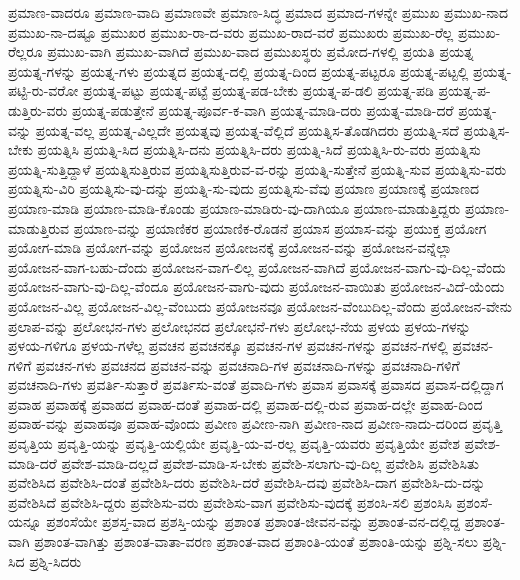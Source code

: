 {ಪ್ರಮಾಣ-ವಾದರೂ
ಪ್ರಮಾಣ-ವಾದಿ
ಪ್ರಮಾಣವೇ
ಪ್ರಮಾಣ-ಸಿದ್ಧ
ಪ್ರಮಾದ
ಪ್ರಮಾದ-ಗಳನ್ನೇ
ಪ್ರಮುಖ
ಪ್ರಮುಖ-ನಾದ
ಪ್ರಮುಖ-ನಾ-ದಷ್ಟೂ
ಪ್ರಮುಖರ
ಪ್ರಮುಖ-ರಾ-ದ-ವರು
ಪ್ರಮುಖ-ರಾದ-ವರೆ
ಪ್ರಮುಖರು
ಪ್ರಮುಖ-ರೆಲ್ಲ
ಪ್ರಮುಖ-ರೆಲ್ಲರೂ
ಪ್ರಮುಖ-ವಾಗಿ
ಪ್ರಮುಖ-ವಾಗಿದೆ
ಪ್ರಮುಖ-ವಾದ
ಪ್ರಮುಖಸ್ಥರು
ಪ್ರಮೋದ-ಗಳಲ್ಲಿ
ಪ್ರಯತಿ
ಪ್ರಯತ್ನ
ಪ್ರಯತ್ನ-ಗಳನ್ನು
ಪ್ರಯತ್ನ-ಗಳು
ಪ್ರಯತ್ನದ
ಪ್ರಯತ್ನ-ದಲ್ಲಿ
ಪ್ರಯತ್ನ-ದಿಂದ
ಪ್ರಯತ್ನ-ಪಟ್ಟರೂ
ಪ್ರಯತ್ನ-ಪಟ್ಟಲ್ಲಿ
ಪ್ರಯತ್ನ-ಪಟ್ಟಿ-ರು-ವರೋ
ಪ್ರಯತ್ನ-ಪಟ್ಟು
ಪ್ರಯತ್ನ-ಪಟ್ಟೆ
ಪ್ರಯತ್ನ-ಪಡ-ಬೇಕು
ಪ್ರಯತ್ನ-ಪ-ಡಲಿ
ಪ್ರಯತ್ನ-ಪಡಿ
ಪ್ರಯತ್ನ-ಪ-ಡುತ್ತಿರು-ವರು
ಪ್ರಯತ್ನ-ಪಡುತ್ತೇನೆ
ಪ್ರಯತ್ನ-ಪೂರ್ವ-ಕ-ವಾಗಿ
ಪ್ರಯತ್ನ-ಮಾಡಿ-ದರು
ಪ್ರಯತ್ನ-ಮಾಡಿ-ದರೆ
ಪ್ರಯತ್ನ-ವನ್ನು
ಪ್ರಯತ್ನ-ವಲ್ಲ
ಪ್ರಯತ್ನ-ವಿಲ್ಲದೇ
ಪ್ರಯತ್ನವು
ಪ್ರಯತ್ನ-ವೆಲ್ಲಿದೆ
ಪ್ರಯತ್ನಿಸ-ತೊಡಗಿದರು
ಪ್ರಯತ್ನಿ-ಸದೆ
ಪ್ರಯತ್ನಿಸ-ಬೇಕು
ಪ್ರಯತ್ನಿಸಿ
ಪ್ರಯತ್ನಿ-ಸಿದ
ಪ್ರಯತ್ನಿಸಿ-ದನು
ಪ್ರಯತ್ನಿಸಿ-ದರು
ಪ್ರಯತ್ನಿ-ಸಿದೆ
ಪ್ರಯತ್ನಿಸಿ-ರು-ವರು
ಪ್ರಯತ್ನಿಸು
ಪ್ರಯತ್ನಿ-ಸುತ್ತಿದ್ದಾಳೆ
ಪ್ರಯತ್ನಿಸುತ್ತಿರುವ
ಪ್ರಯತ್ನಿಸುತ್ತಿರುವ-ವ-ರನ್ನು
ಪ್ರಯತ್ನಿ-ಸುತ್ತೇನೆ
ಪ್ರಯತ್ನಿ-ಸುವ
ಪ್ರಯತ್ನಿಸು-ವರು
ಪ್ರಯತ್ನಿಸು-ವಿರಿ
ಪ್ರಯತ್ನಿಸು-ವು-ದನ್ನು
ಪ್ರಯತ್ನಿ-ಸು-ವುದು
ಪ್ರಯತ್ನಿಸು-ವೆವು
ಪ್ರಯಾಣ
ಪ್ರಯಾಣಕ್ಕೆ
ಪ್ರಯಾಣದ
ಪ್ರಯಾಣ-ಮಾಡಿ
ಪ್ರಯಾಣ-ಮಾಡಿ-ಕೊಂಡು
ಪ್ರಯಾಣ-ಮಾಡಿರು-ವು-ದಾಗಿಯೂ
ಪ್ರಯಾಣ-ಮಾಡುತ್ತಿದ್ದರು
ಪ್ರಯಾಣ-ಮಾಡುತ್ತಿರುವ
ಪ್ರಯಾಣ-ವನ್ನು
ಪ್ರಯಾಣಿಕರ
ಪ್ರಯಾಣಿಕ-ರೊಡನೆ
ಪ್ರಯಾಸ
ಪ್ರಯಾಸ-ವನ್ನು
ಪ್ರಯುಕ್ತ
ಪ್ರಯೋಗ
ಪ್ರಯೋಗ-ಮಾಡಿ
ಪ್ರಯೋಗ-ವನ್ನು
ಪ್ರಯೋಜನ
ಪ್ರಯೋಜನಕ್ಕೆ
ಪ್ರಯೋಜನ-ವನ್ನು
ಪ್ರಯೋಜನ-ವನ್ನೆಲ್ಲಾ
ಪ್ರಯೋಜನ-ವಾಗ-ಬಹು-ದೆಂದು
ಪ್ರಯೋಜನ-ವಾಗ-ಲಿಲ್ಲ
ಪ್ರಯೋಜನ-ವಾಗಿದೆ
ಪ್ರಯೋಜನ-ವಾಗು-ವು-ದಿಲ್ಲ-ವೆಂದು
ಪ್ರಯೋಜನ-ವಾಗು-ವು-ದಿಲ್ಲ-ವೆಂದೂ
ಪ್ರಯೋಜನ-ವಾಗು-ವುದು
ಪ್ರಯೋಜನ-ವಾಯಿತು
ಪ್ರಯೋಜನ-ವಿದೆ-ಯೆಂದು
ಪ್ರಯೋಜನ-ವಿಲ್ಲ
ಪ್ರಯೋಜನ-ವಿಲ್ಲ-ವೆಂಬುದು
ಪ್ರಯೋಜನವೂ
ಪ್ರಯೋಜನ-ವೆಂಬುದಿಲ್ಲ-ವೆಂದು
ಪ್ರಯೋಜನ-ವೇನು
ಪ್ರಲಾಪ-ವನ್ನು
ಪ್ರಲೋಭನ-ಗಳು
ಪ್ರಲೋಭನದ
ಪ್ರಲೋಭನೆ-ಗಳು
ಪ್ರಲೋಭ-ನೆಯ
ಪ್ರಳಯ
ಪ್ರಳಯ-ಗಳನ್ನು
ಪ್ರಳಯ-ಗಳಿಗೂ
ಪ್ರಳಯ-ಗಳೆಲ್ಲ
ಪ್ರವಚನ
ಪ್ರವಚನಕ್ಕೂ
ಪ್ರವಚನ-ಗಳ
ಪ್ರವಚನ-ಗಳನ್ನು
ಪ್ರವಚನ-ಗಳಲ್ಲಿ
ಪ್ರವಚನ-ಗಳಿಗೆ
ಪ್ರವಚನ-ಗಳು
ಪ್ರವಚನದ
ಪ್ರವಚನ-ವನ್ನು
ಪ್ರವಚನಾದಿ-ಗಳ
ಪ್ರವಚನಾದಿ-ಗಳನ್ನು
ಪ್ರವಚನಾದಿ-ಗಳಿಗೆ
ಪ್ರವಚನಾದಿ-ಗಳು
ಪ್ರವರ್ತಿ-ಸುತ್ತಾರೆ
ಪ್ರವರ್ತಿಸು-ವಂತೆ
ಪ್ರವಾದಿ-ಗಳು
ಪ್ರವಾಸ
ಪ್ರವಾಸಕ್ಕೆ
ಪ್ರವಾಸದ
ಪ್ರವಾಸ-ದಲ್ಲಿದ್ದಾಗ
ಪ್ರವಾಹ
ಪ್ರವಾಹಕ್ಕೆ
ಪ್ರವಾಹದ
ಪ್ರವಾಹ-ದಂತೆ
ಪ್ರವಾಹ-ದಲ್ಲಿ
ಪ್ರವಾಹ-ದಲ್ಲಿ-ರುವ
ಪ್ರವಾಹ-ದಲ್ಲೇ
ಪ್ರವಾಹ-ದಿಂದ
ಪ್ರವಾಹ-ವನ್ನು
ಪ್ರವಾಹವೂ
ಪ್ರವಾಹ-ವೊಂದು
ಪ್ರವೀಣ
ಪ್ರವೀಣ-ನಾಗಿ
ಪ್ರವೀಣ-ನಾದ
ಪ್ರವೀಣ-ನಾದು-ದರಿಂದ
ಪ್ರವೃತ್ತಿ
ಪ್ರವೃತ್ತಿಯ
ಪ್ರವೃತ್ತಿ-ಯನ್ನು
ಪ್ರವೃತ್ತಿ-ಯಲ್ಲಿಯೇ
ಪ್ರವೃತ್ತಿ-ಯ-ವ-ರಲ್ಲ
ಪ್ರವೃತ್ತಿ-ಯವರು
ಪ್ರವೃತ್ತಿಯೇ
ಪ್ರವೇಶ
ಪ್ರವೇಶ-ಮಾಡಿ-ದರೆ
ಪ್ರವೇಶ-ಮಾಡಿ-ದಲ್ಲದೆ
ಪ್ರವೇಶ-ಮಾಡಿ-ಸ-ಬೇಕು
ಪ್ರವೇಶಿ-ಸಲಾಗು-ವು-ದಿಲ್ಲ
ಪ್ರವೇಶಿಸಿ
ಪ್ರವೇಶಿಸಿತು
ಪ್ರವೇಶಿಸಿದ
ಪ್ರವೇಶಿಸಿ-ದಂತೆ
ಪ್ರವೇಶಿಸಿ-ದರು
ಪ್ರವೇಶಿಸಿ-ದರೆ
ಪ್ರವೇಶಿಸಿ-ದವು
ಪ್ರವೇಶಿಸಿ-ದಾಗ
ಪ್ರವೇಶಿಸಿ-ದು-ದನ್ನು
ಪ್ರವೇಶಿಸಿದೆ
ಪ್ರವೇಶಿಸಿ-ದ್ದರು
ಪ್ರವೇಶಿಸು-ವರು
ಪ್ರವೇಶಿಸು-ವಾಗ
ಪ್ರವೇಶಿಸು-ವುದಕ್ಕೆ
ಪ್ರಶಂಸಿ-ಸಲಿ
ಪ್ರಶಂಸಿಸಿ
ಪ್ರಶಂಸೆ-ಯನ್ನೂ
ಪ್ರಶಂಸೆಯೇ
ಪ್ರಶಸ್ತ-ವಾದ
ಪ್ರಶಸ್ತಿ-ಯನ್ನು
ಪ್ರಶಾಂತ
ಪ್ರಶಾಂತ-ಜೀವನ-ವನ್ನು
ಪ್ರಶಾಂತ-ವನ-ದಲ್ಲಿದ್ದ
ಪ್ರಶಾಂತ-ವಾಗಿ
ಪ್ರಶಾಂತ-ವಾಗಿತ್ತು
ಪ್ರಶಾಂತ-ವಾತಾ-ವರಣ
ಪ್ರಶಾಂತ-ವಾದ
ಪ್ರಶಾಂತಿ-ಯಂತೆ
ಪ್ರಶಾಂತಿ-ಯನ್ನು
ಪ್ರಶ್ನಿ-ಸಲು
ಪ್ರಶ್ನಿ-ಸಿದ
ಪ್ರಶ್ನಿ-ಸಿದರು
}
